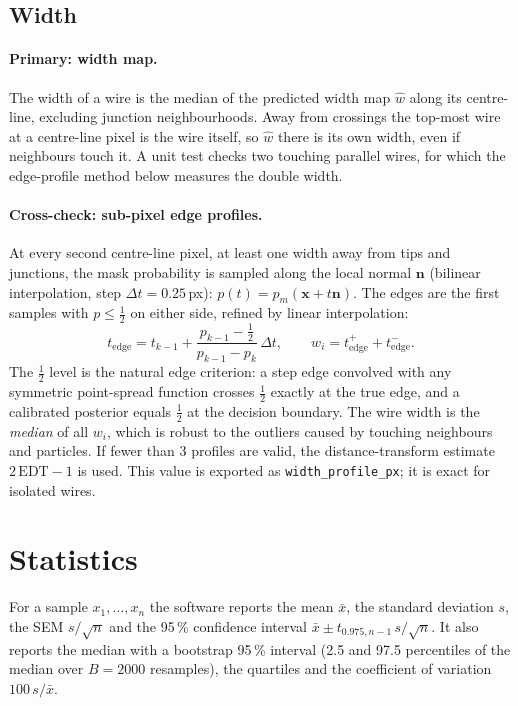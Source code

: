 \documentclass[11pt,a4paper]{article}
\newcommand{\code}[1]{\texttt{#1}}
\begin{document}
\subsection{Width}
\paragraph{Primary: width map.} The width of a wire is the median of the predicted width map $\hat w$ along its centre-line, excluding junction neighbourhoods. Away from crossings the top-most wire at a centre-line pixel is the wire itself, so $\hat w$ there is its own width, even if neighbours touch it. A unit test checks two touching parallel wires, for which the edge-profile method below measures the double width.

\paragraph{Cross-check: sub-pixel edge profiles.} At every second centre-line pixel, at least one width away from tips and junctions, the mask probability is sampled along the local normal $\mathbf n$ (bilinear interpolation, step $\Delta t=0.25$\,px): $p(t)=p_m(\mathbf x+t\mathbf n)$. The edges are the first samples with $p\le\tfrac12$ on either side, refined by linear interpolation:
\begin{equation}
t_{\text{edge}}=t_{k-1}+\frac{p_{k-1}-\tfrac12}{p_{k-1}-p_k}\,\Delta t,\qquad w_i=t_{\text{edge}}^{+}+t_{\text{edge}}^{-}.
\end{equation}
The $\tfrac12$ level is the natural edge criterion: a step edge convolved with any symmetric point-spread function crosses $\tfrac12$ exactly at the true edge, and a calibrated posterior equals $\tfrac12$ at the decision boundary. The wire width is the \emph{median} of all $w_i$, which is robust to the outliers caused by touching neighbours and particles. If fewer than 3 profiles are valid, the distance-transform estimate $2\,\mathrm{EDT}-1$ is used. This value is exported as \code{width\_profile\_px}; it is exact for isolated wires.

\section{Statistics}\label{sec:stats}
For a sample $x_1,\dots,x_n$ the software reports the mean $\bar x$, the standard deviation $s$, the SEM $s/\sqrt n$ and the 95\,\% confidence interval $\bar x\pm t_{0.975,n-1}\,s/\sqrt n$. It also reports the median with a bootstrap 95\,\% interval (2.5 and 97.5 percentiles of the median over $B=2000$ resamples), the quartiles and the coefficient of variation $100\,s/\bar x$.
\end{document}
